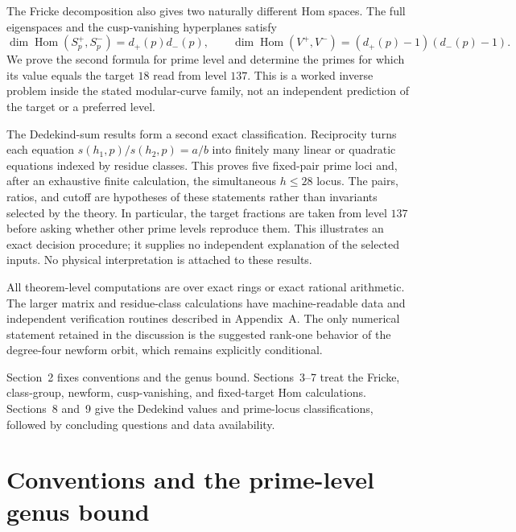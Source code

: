 \documentclass[11pt]{article}
\theoremstyle{definition}
\theoremstyle{remark}
\DeclareMathOperator{\Hom}{Hom}
\begin{document}
The Fricke decomposition also gives two naturally different Hom spaces.  The
full eigenspaces and the cusp-vanishing hyperplanes satisfy
\[
  \dim\Hom(S_p^+,S_p^-)=d_+(p)d_-(p),\qquad
  \dim\Hom(V^+,V^-)=(d_+(p)-1)(d_-(p)-1).
\]
We prove the second formula for prime level and determine the primes for which
its value equals the target $18$ read from level $137$.
This is a worked inverse problem inside the stated modular-curve family,
not an independent prediction of the target or a preferred level.

The Dedekind-sum results form a second exact classification.  Reciprocity
turns each equation $s(h_1,p)/s(h_2,p)=a/b$ into finitely many linear or
quadratic equations indexed by residue classes.  This proves five fixed-pair
prime loci and, after an exhaustive finite calculation, the simultaneous
$h\leq28$ locus.  The pairs, ratios, and cutoff are hypotheses of these
statements rather than invariants selected by the theory.  In particular,
the target fractions are taken from level $137$ before asking whether other
prime levels reproduce them.  This illustrates an exact decision procedure;
it supplies no independent explanation of the selected inputs.
No physical interpretation is attached to these results.

All theorem-level computations are over exact rings or exact rational
arithmetic.  The larger matrix and residue-class calculations have
machine-readable data and independent verification routines described in
Appendix~A.  The only numerical statement retained in the discussion is the
suggested rank-one behavior of the degree-four newform orbit, which remains
explicitly conditional.

Section~2 fixes conventions and the genus bound.  Sections~3--7 treat the
Fricke, class-group, newform, cusp-vanishing, and fixed-target Hom
calculations.  Sections~8 and~9 give the Dedekind values and prime-locus
classifications, followed by concluding questions and data availability.

\section{Conventions and the prime-level genus bound}
\end{document}
